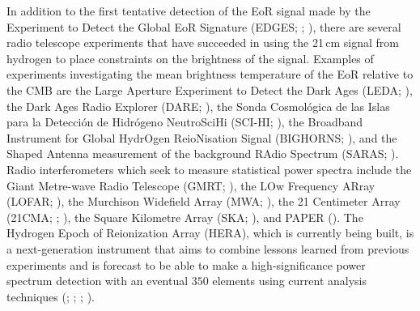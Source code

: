 \documentclass[preprint2,numberedappendix,tighten]{aastex6}  %
\begin{document}
In addition to the first tentative detection of the EoR signal made by the Experiment to Detect the Global EoR Signature (EDGES; \citealt{bowman_et_al2018}; \citealt{bowman2010}), there are several radio telescope experiments that have succeeded in using 
the 21\,cm signal from hydrogen to place constraints on the brightness of the signal. Examples of experiments investigating the 
mean brightness temperature of the EoR relative to the CMB are the Large Aperture Experiment to Detect the Dark Ages (LEDA; \citealt{bernardi_et_al2016}), the 
Dark Ages Radio Explorer (DARE; \citealt{burns2012}), the Sonda Cosmol\'ogica de las Islas para la Detecci\'on de 
Hidr\'ogeno NeutroSciHi (SCI-HI; \citealt{voytek2014}), the Broadband Instrument for Global HydrOgen ReioNisation Signal 
(BIGHORNS; \citealt{sokolowski2015}), and the Shaped Antenna measurement of the background RAdio Spectrum (SARAS; 
\citealt{patra2015}). Radio interferometers which seek to measure statistical power spectra include the Giant Metre-wave 
Radio Telescope (GMRT; \citealt{paciga_et_al2013}), the LOw Frequency ARray (LOFAR; \citealt{van_haarlem_et_al2013}), 
the Murchison Widefield Array (MWA; \citealt{tingay_et_al2013}), the 21 Centimeter Array (21CMA; 
\citealt{peterson_et_al2004}; \citealt{wu2009}), the Square Kilometre Array (SKA; \citealt{koopmans_et_al2015}), and PAPER (\citealt{parsons_et_al2010}). The Hydrogen Epoch of 
Reionization Array (HERA), which is currently being built, is a next-generation instrument that aims to combine lessons 
learned from previous experiments and is forecast to be able to make a high-significance power spectrum 
detection with an eventual $350$ elements using current analysis techniques (\citealt{pober_et_al2014}; \citealt{liu_parsons_2016}; \citealt{dillon_parsons2016}; \citealt{deboer_et_al2017}).
\end{document}
